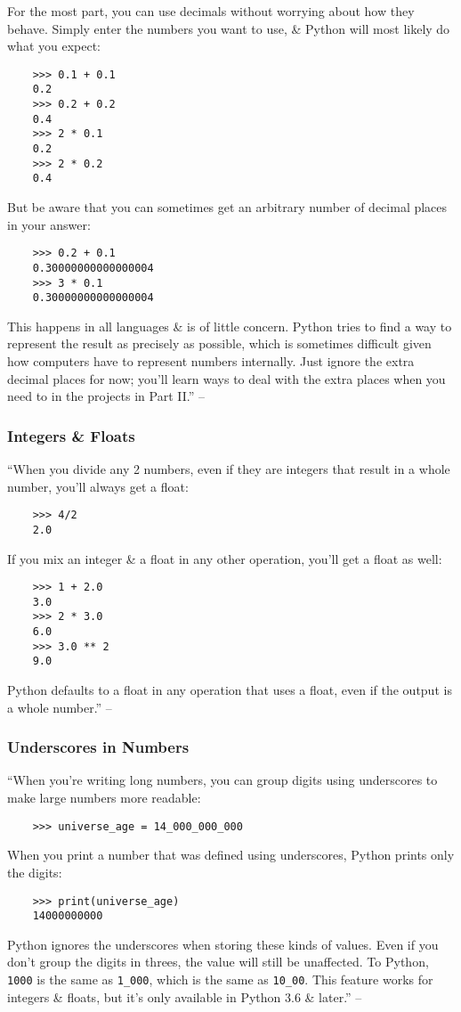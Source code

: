 \documentclass[oneside]{book}
\numberwithin{equation}{section}
\begin{document}
For the most part, you can use decimals without worrying about how they behave. Simply enter the numbers you want to use, \& Python will most likely do what you expect:
\begin{verbatim}
	>>> 0.1 + 0.1
	0.2
	>>> 0.2 + 0.2
	0.4
	>>> 2 * 0.1
	0.2
	>>> 2 * 0.2
	0.4
\end{verbatim}
But be aware that you can sometimes get an arbitrary number of decimal places in your answer:
\begin{verbatim}
	>>> 0.2 + 0.1
	0.30000000000000004
	>>> 3 * 0.1
	0.30000000000000004
\end{verbatim}
This happens in all languages \& is of little concern. Python tries to find a way to represent the result as precisely as possible, which is sometimes difficult given how computers have to represent numbers internally. Just ignore the extra decimal places for now; you'll learn ways to deal with the extra places when you need to in the projects in Part II.'' -- \cite[pp. 26--27]{Matthes2019}

\subsubsection{Integers \& Floats}
``When you divide any 2 numbers, even if they are integers that result in a whole number, you'll always get a float:
\begin{verbatim}
	>>> 4/2
	2.0
\end{verbatim}
If you mix an integer \& a float in any other operation, you'll get a float as well:
\begin{verbatim}
	>>> 1 + 2.0
	3.0
	>>> 2 * 3.0
	6.0
	>>> 3.0 ** 2
	9.0
\end{verbatim}
Python defaults to a float in any operation that uses a float, even if the output is a whole number.'' -- \cite[p. 27]{Matthes2019}

\subsubsection{Underscores in Numbers}
``When you're writing long numbers, you can group digits using underscores to make large numbers more readable:
\begin{verbatim}
	>>> universe_age = 14_000_000_000
\end{verbatim}
When you print a number that was defined using underscores, Python prints only the digits:
\begin{verbatim}
	>>> print(universe_age)
	14000000000
\end{verbatim}
Python ignores the underscores when storing these kinds of values. Even if you don't group the digits in threes, the value will still be unaffected. To Python, \texttt{1000} is the same as \verb|1_000|, which is the same as \verb|10_00|. This feature works for integers \& floats, but it's only available in Python 3.6 \& later.'' -- \cite[p. 28]{Matthes2019}
\end{document}
